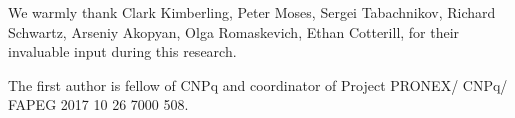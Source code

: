 We warmly thank Clark Kimberling, Peter Moses, Sergei Tabachnikov, Richard Schwartz, Arseniy Akopyan, Olga Romaskevich, Ethan Cotterill, for their invaluable input during this research.

The first author is fellow of CNPq and coordinator of Project PRONEX/ CNPq/ FAPEG 2017 10 26 7000 508.